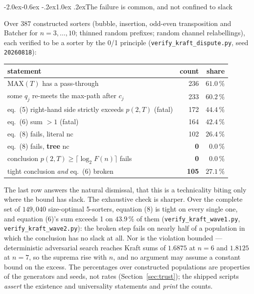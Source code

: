 \documentclass[11pt,a4paper]{article}
\makeatletter
\renewcommand\subsection{\@startsection{subsection}{2}{\z@}%
  {-2.0ex\@plus -0.6ex \@minus -.2ex}{1.0ex \@plus .2ex}{\normalfont\normalsize\bfseries}}
\newcommand{\MAX}{\mathrm{MAX}}
\newcommand{\nc}{\mathrm{nc}}
\makeatother
\begin{document}
\subsection{The failure is common, and not confined to slack}

Over $387$ constructed sorters (bubble, insertion, odd-even transposition and
Batcher for $n = 3,\dots,10$; thinned random prefixes; random channel
relabellings), each verified to be a sorter by the 0/1 principle
(\texttt{verify\_kraft\_dispute.py}, seed \texttt{20260818}):

\begin{center}
\begin{tabular}{lrr}
\toprule
statement & count & share \\
\midrule
$\MAX(T)$ has a pass-through & 236 & $61.0\,\%$ \\
some $q_j$ re-meets the max-path after $c_j$ & 233 & $60.2\,\%$ \\
eq.~(5) right-hand side strictly exceeds $p(2,T)$ (fatal) & 172 & $44.4\,\%$ \\
eq.~(6) sum $>1$ (fatal) & 164 & $42.4\,\%$ \\
eq.~(8) fails, literal $\nc$ & 102 & $26.4\,\%$ \\
eq.~(8) fails, \textbf{tree} $\nc$ & \textbf{0} & $0.0\,\%$ \\
conclusion $p(2,T) \ge \lceil \log_2 F(n)\rceil$ fails & \textbf{0} & $0.0\,\%$ \\
tight conclusion \emph{and} eq.~(6) broken & \textbf{105} & $\mathbf{27.1\,\%}$ \\
\bottomrule
\end{tabular}
\end{center}

The last row answers the natural dismissal, that this is a technicality biting
only where the bound has slack. The exhaustive check is sharper. Over the
complete set of $149{,}040$ size-optimal 5-sorters, equation (8) is tight on
every single one, and equation (6)'s sum exceeds 1 on $43.9\,\%$ of them
(\texttt{verify\_kraft\_wave1.py}, \texttt{verify\_kraft\_wave2.py}): the broken
step fails on nearly half of a population in which the conclusion has no slack
at all. Nor is the violation bounded --- deterministic adversarial search
reaches Kraft sums of $1.6875$ at $n=6$ and $1.8125$ at $n=7$, so the suprema
rise with $n$, and no argument may assume a constant bound on the excess. The
percentages over constructed populations are properties of the generators and
seeds, not rates (Section~\ref{sec:trust}); the shipped scripts \emph{assert}
the existence and universality statements and \emph{print} the counts.
\end{document}
